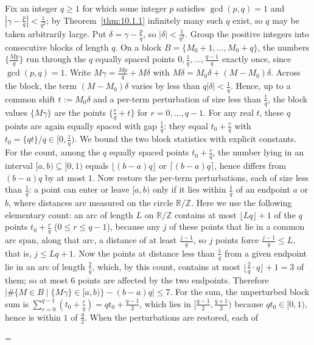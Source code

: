 \documentclass[11pt]{article}
\makeatletter
\theoremstyle{ntstyle}
\let\nt@closedisplay\]
\def\nt@guardedclose{\@ifnextchar\par{\nt@closeafterpar}{\@ifnextchar\end{\postdisplaypenalty\@M\nt@closedisplay}{\nt@closedisplay}}}
\def\nt@closeafterpar\par{\@ifnextchar\par{\nt@closeafterpar}{\@ifnextchar\end{\postdisplaypenalty\@M\nt@closedisplay\par}{\nt@closedisplay\par}}}
\renewenvironment{proof}[1][\proofname]{\par
  \pushQED{\qed}\normalfont\topsep\medskipamount\edef\nt@afterproof{\@endparpenalty=\the\@endparpenalty\relax}\@beginparpenalty\@M\@endparpenalty\@M\let\]\nt@guardedclose\trivlist\item[]\textit{#1\@addpunct{.}} \ignorespaces}{\ifvmode\addpenalty\@M\fi\popQED\nt@afterproof\endtrivlist\@endpefalse}
\makeatother
\begin{document}
\begin{proof} Fix an integer $q\ge1$ for
	which some integer $p$ satisfies $\gcd(p, q)=1$ and $|\gamma-\tfrac{p}{q}|<\tfrac{1}{q^2}$; by Theorem~\ref{thm:10.1.1} infinitely many such $q$ exist,
	so $q$ may be taken arbitrarily large. Put $\delta=\gamma-\tfrac{p}{q}$,
	so $|\delta|<\tfrac{1}{q^2}$. Group the positive integers into
	consecutive blocks of length $q$. On a block
	$B=\{M_0+1,\ldots,M_0+q\}$, the numbers $\{\tfrac{Mp}{q}\}$ run through
	the $q$ equally spaced points $0,\tfrac{1}{q},\ldots,\tfrac{q-1}{q}$ exactly
	once, since $\gcd(p, q)=1$. Write $M\gamma=\tfrac{Mp}{q}+M\delta$ with
	$M\delta=M_0\delta+(M-M_0)\delta$. Across the block, the term
	$(M-M_0)\delta$ varies by less than $q|\delta|<\tfrac{1}{q}$. Hence, up
	to a common shift $t:=M_0\delta$ and a per-term perturbation of size
	less than $\tfrac{1}{q}$, the block values $\{M\gamma\}$ are the points $\{\tfrac{r}{q}+t\}$ for $r=0,\ldots,q-1$. For any real $t$, these $q$ points are again
	equally spaced with gap $\tfrac{1}{q}$: they equal $t_0+\tfrac{r}{q}$ with
	$t_0=\{qt\}/q\in[0,\tfrac{1}{q})$. We bound the two block
	statistics with explicit constants. For the count, among the $q$ equally
	spaced points $t_0+\tfrac{r}{q}$, the number lying in an interval
	$[a,b)\subseteq[0,1)$ equals $\lfloor(b-a)q\rfloor$ or
	$\lceil(b-a)q\rceil$, hence differs from $(b-a)q$ by at most $1$. Now
	restore the per-term perturbations, each of size less than $\tfrac{1}{q}$: a point
	can enter or leave $[a,b)$ only if it lies within
	$\tfrac{1}{q}$ of an endpoint $a$ or $b$, where distances are measured on the circle
	$\mathbb{R}/\mathbb{Z}$. Here we use the following elementary count: an
	arc of length $L$ on $\mathbb{R}/\mathbb{Z}$ contains at most $\lfloor
		Lq\rfloor + 1$ of the $q$ points $t_0 + \tfrac{r}{q}$ ($0 \le r \le
		q-1$), because any $j$ of these points that lie in a common arc span,
	along that arc, a distance of at least $\tfrac{j-1}{q}$, so $j$ points
	force $\tfrac{j-1}{q} \le L$, that is, $j \le Lq + 1$. Now the points at
	distance less than $\tfrac{1}{q}$ from a given endpoint lie in an arc of length
	$\tfrac{2}{q}$, which, by this count, contains at most
	$\lfloor\tfrac{2}{q}\cdot q\rfloor + 1 = 3$ of them; so at most $6$
	points are affected by the two endpoints. Therefore
	$\big|\#\{M\in B \mid \{M\gamma\}\in[a,b)\}-(b-a)q\big|\le 7$.
	For the sum, the unperturbed block sum is
	$\sum_{r=0}^{q-1}(t_0+\tfrac{r}{q})=qt_0+\tfrac{q-1}{2}$, which lies in
	$\big[\tfrac{q-1}{2},\tfrac{q+1}{2}\big)$ because $qt_0\in[0,1)$, hence
	is within $1$ of $\tfrac{q}{2}$. When the perturbations are restored, each of

\end{proof}
\end{document}

